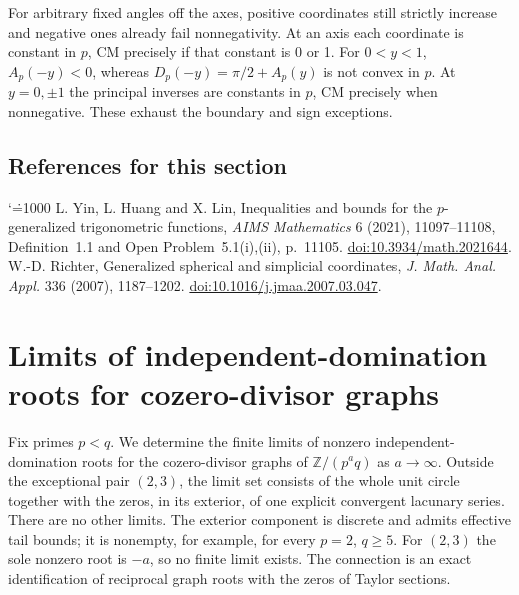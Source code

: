 \documentclass[11pt,a4paper]{article}
\makeatletter
\numberwithin{equation}{section}
\theoremstyle{definition}
\theoremstyle{remark}
\newenvironment{sectionabstract}{\par\smallskip\begingroup\small\noindent}{\par\endgroup\medskip}
\renewenvironment{thebibliography}[1]
 {\subsection*{References for this section}\small
  \list{\@biblabel{\@arabic\c@enumiv}}
       {\settowidth\labelwidth{\@biblabel{#1}}\leftmargin\labelwidth
        \advance\leftmargin\labelsep\@openbib@code
        \usecounter{enumiv}\let\p@enumiv\@empty
        \renewcommand\theenumiv{\@arabic\c@enumiv}}
  \sloppy\clubpenalty4000\widowpenalty4000\sfcode`\.=1000\relax}
 {\def\@noitemerr{\@latex@warning{Empty bibliography}}\endlist}
\makeatother
\begin{document}
For arbitrary fixed angles off the axes, positive coordinates still strictly increase and negative ones already fail nonnegativity. At an axis each coordinate is constant in $p$, CM precisely if that constant is 0 or 1. For $0<y<1$, $A_p(-y)<0$, whereas $D_p(-y)=\pi/2+A_p(y)$ is not convex in $p$. At $y=0,\pm1$ the principal inverses are constants in $p$, CM precisely when nonnegative. These exhaust the boundary and sign exceptions.

\begin{thebibliography}{9}
 L. Yin, L. Huang and X. Lin, Inequalities and bounds for the $p$-generalized trigonometric functions, \emph{AIMS Mathematics} 6 (2021), 11097--11108, Definition~1.1 and Open Problem~5.1(i),(ii), p.~11105. \href{https://doi.org/10.3934/math.2021644}{doi:10.3934/math.2021644}.
 W.-D. Richter, Generalized spherical and simplicial coordinates, \emph{J. Math. Anal. Appl.} 336 (2007), 1187--1202. \href{https://doi.org/10.1016/j.jmaa.2007.03.047}{doi:10.1016/j.jmaa.2007.03.047}.
\end{thebibliography}

\par\endgroup

\begingroup
\newcommand{\C}{\mathbb C}
\newcommand{\Z}{\mathbb Z}
\section{\texorpdfstring{Limits of independent-domination roots for cozero-divisor graphs}{Limits of independent-domination roots for cozero-divisor graphs}}\label{section:r42reiwa}
\par\medskip


\begin{sectionabstract}
Fix primes $p<q$. We determine the finite limits of nonzero independent-domination roots for the cozero-divisor graphs of $\Z/(p^a q)$ as $a\to\infty$. Outside the exceptional pair $(2,3)$, the limit set consists of the whole unit circle together with the zeros, in its exterior, of one explicit convergent lacunary series. There are no other limits. The exterior component is discrete and admits effective tail bounds; it is nonempty, for example, for every $p=2$, $q\ge5$. For $(2,3)$ the sole nonzero root is $-a$, so no finite limit exists. The connection is an exact identification of reciprocal graph roots with the zeros of Taylor sections.
\end{sectionabstract}
\end{document}
